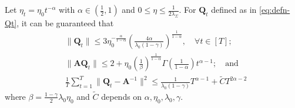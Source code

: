 \begin{customlemma}\label{lemma:Q-bound}
Let $\eta_t = \eta_0 t^{-\alpha}$ with $\alpha \in (\frac{1}{2},1)$ and $0 \leq \eta \leq \frac{1}{2\lambda_{\Sigma}}$. For $\bm{Q}_t$ defined as in \eqref{eq:defn-Qt}, it can be guaranteed that
\begin{align}
&\|\bm{Q}_t\| \leq 3\eta_0^{-\frac{\alpha}{1-\alpha}} \left(\frac{4\alpha}{\lambda_0(1-\gamma)}\right)^{\frac{1}{1-\alpha}}, \quad \forall t \in [T];  \label{eq:Q-bound} \\ 
&\|\bm{A} \bm{Q}_t\| \leq 2 + \eta_0 \left(\frac{1}{\beta}\right)^{\frac{1}{1-\alpha}}\Gamma \left(\frac{1}{1-\alpha}\right)t^{\alpha-1}; \label{eq:AQ-bound} \quad \text{and}\\ 
&\frac{1}{T}\sum_{t=1}^T \|\bm{Q}_t - \bm{A}^{-1}\|^2 \leq \frac{1}{\lambda_0(1-\gamma)}T^{\alpha-1} + \widetilde{C}T^{2\alpha-2}\label{eq:AQ-I-bound}
\end{align}
where $\beta = \frac{1-\gamma}{2}\lambda_0 \eta_0$  and $\widetilde{C}$ depends on $\alpha,\eta_0,\lambda_0,\gamma$.
\end{customlemma}

